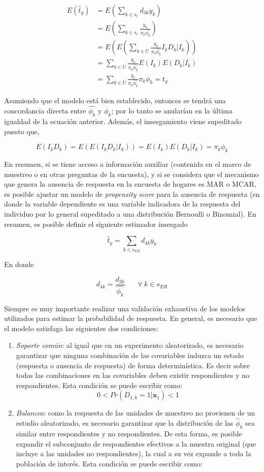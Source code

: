 \documentclass[
  12pt,
]{book}
\providecommand{\tightlist}{%
  \setlength{\itemsep}{0pt}\setlength{\parskip}{0pt}}
\begin{document}
\begin{align*}
E(\hat{t}_y) &= E\left(\sum_{k\in s_r}d_{3k}y_k\right) \\
&= E\left(\sum_{k\in s_r}\frac{y_k}{\pi_k \hat{\phi_k}}\right)\\
&= E\left(E\left(\sum_{k\in U}\frac{y_k}{\pi_k \hat{\phi_k}}I_kD_k|I_k\right)\right)\\
&= \sum_{k\in U}\frac{y_k}{\pi_k \hat{\phi_k}}E\left(I_k\right)E\left(D_k|I_k\right)\\
&= \sum_{k\in U}\frac{y_k}{\pi_k \hat{\phi_k}}\pi_k\phi_k = t_y
\end{align*}

Asumiendo que el modelo está bien establecido, entonces se tendrá una concordancia directa entre \(\hat{\phi_k}\) y \(\phi_k\); por lo tanto se anularían en la última igualdad de la ecuación anterior. Además, el insesgamiento viene supeditado puesto que,

\[
E(I_kD_k) 
= E\left(E(I_kD_k|I_k) \right)
= E(I_k)E(D_k|I_k) = \pi_k \phi_k
\]

En resumen, si se tiene acceso a información auxiliar (contenida en el marco de muestreo o en otras preguntas de la encuesta), y si se considera que el mecanismo que genera la ausencia de respuesta en la encuesta de hogares es MAR o MCAR, es posible ajustar un modelo de \emph{propensity score} para la ausencia de respuesta (en donde la variable dependiente es una variable indicadora de la respuesta del individuo por lo general supeditado a una distribución Bernoulli o Binomial). En resumen, es posible definir el siguiente estimador insesgado

\[
\hat{t}_y=\sum_{k\in s_{ER}}d_{4k}y_k
\]

En donde

\[
d_{4k} = \frac{d_{3k}}{\hat{\phi_k}}  \ \ \ \ \ \ \ \ \forall \ k  \in s_{ER}
\]

Siempre es muy importante realizar una validación exhaustiva de los modelos utilizados para estimar la probabilidad de respuesta. En general, es necesario que el modelo satisfaga las siguientes dos condiciones:

\begin{enumerate}
\def\labelenumi{\arabic{enumi}.}
\tightlist
\item
  \emph{Soporte común}: al igual que en un experimento aleatorizado, es necesario garantizar que ninguna combinación de las covariables induzca un estado (respuesta o ausencia de respuesta) de forma determinística. Es decir sobre todas las combinaciones en las covariables deben existir respondientes y no respondientes. Esta condición se puede escribir como:
  \[
  0 < Pr(D_{1,k} = 1 |\mathbf{x}_{1}) < 1 
  \]
\item
  \emph{Balanceo}: como la respuesta de las unidades de muestreo no provienen de un estudio aleatorizado, es necesario garantizar que la distribución de las \(\hat\phi_k\) sea similar entre respondientes y no respondientes. De esta forma, es posible expandir el subconjunto de respondientes efectivos a la muestra original (que incluye a las unidades no respondientes), la cual a su vez expande a toda la población de interés. Esta condición se puede escribir como:
\end{enumerate}
\end{document}
